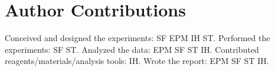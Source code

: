 \section{Author Contributions}\label{author-contributions}


Conceived and designed the experiments: SF EPM IH ST. Performed the
experiments: SF ST. Analyzed the data: EPM SF ST IH. Contributed
reagents/materials/analysis tools: IH. Wrote the report: EPM SF ST IH.
